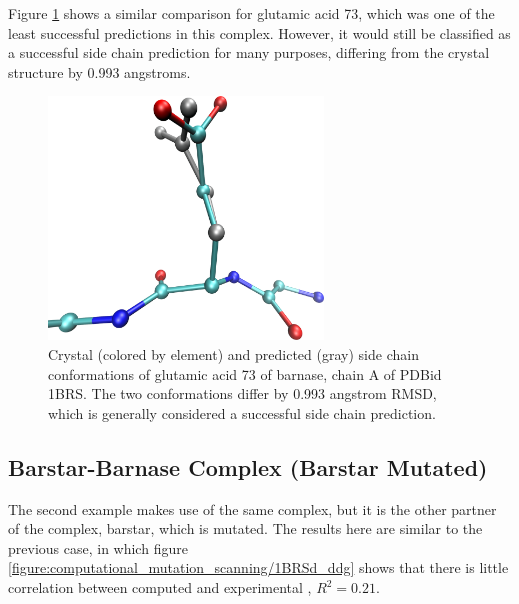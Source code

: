 Figure \ref{figure:computational_mutation_scanning/1brs_a_73} shows a similar comparison for glutamic acid 73, which was one of the least successful predictions in this complex.
However, it would still be classified as a successful side chain prediction for many purposes, differing from the crystal structure by 0.993 angstroms.
\begin{figure}[h]
    \centering
    \includegraphics[width=0.65\textwidth,height=0.3\textheight,keepaspectratio]{figures/mutation_side_chain_images/1brs_chain_a_73.png}
    \caption{Crystal (colored by element) and predicted (gray) side chain conformations of glutamic acid 73 of barnase, chain A of PDBid 1BRS.
    The two conformations differ by 0.993 angstrom RMSD, which is generally considered a successful side chain prediction.}
    \label{figure:computational_mutation_scanning/1brs_a_73}
\end{figure}

\FloatBarrier
\subsection{Barstar-Barnase Complex (Barstar Mutated)}
The second example makes use of the same complex, but it is the other partner of the complex, barstar, which is mutated.
The results here are similar to the previous case, in which figure \ref{figure:computational_mutation_scanning/1BRSd_ddg} shows that there is little correlation between computed and experimental \ddg, $R^{2}=0.21$.

